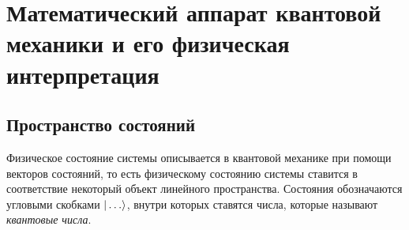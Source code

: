 \chapter[Математический аппарат квантовой механики]{Математический аппарат квантовой механики и его физическая интерпретация}
\section{Пространство состояний}

Физическое состояние системы описывается в квантовой механике при помощи векторов состояний, то есть физическому состоянию системы ставится в соответствие некоторый объект линейного пространства. Состояния обозначаются угловыми скобками $| \ldots \rangle$, внутри которых ставятся числа, которые называют \emph{квантовые числа}.

